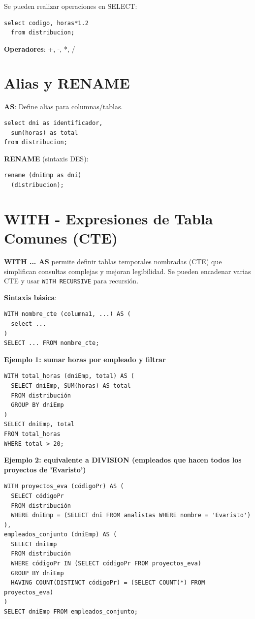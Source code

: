 \documentclass[8pt,a4paper,twocolumn]{article}
\begin{document}
Se pueden realizar operaciones en SELECT:
\begin{lstlisting}
select codigo, horas*1.2 
  from distribucion;
\end{lstlisting}

\textbf{Operadores}: +, -, *, /

\section{Alias y RENAME}

\textbf{AS}: Define alias para columnas/tablas.
\begin{lstlisting}
select dni as identificador,
  sum(horas) as total
from distribucion;
\end{lstlisting}

\textbf{RENAME} (sintaxis DES):
\begin{lstlisting}
rename (dniEmp as dni)
  (distribucion);
\end{lstlisting}

\section{WITH - Expresiones de Tabla Comunes (CTE)}

\textbf{WITH ... AS} permite definir tablas temporales nombradas (CTE) que simplifican consultas complejas y mejoran legibilidad. Se pueden encadenar varias CTE y usar \texttt{WITH RECURSIVE} para recursión.

\textbf{Sintaxis básica}:
\begin{lstlisting}
WITH nombre_cte (columna1, ...) AS (
  select ...
)
SELECT ... FROM nombre_cte;
\end{lstlisting}

\textbf{Ejemplo 1: sumar horas por empleado y filtrar}
\begin{lstlisting}
WITH total_horas (dniEmp, total) AS (
  SELECT dniEmp, SUM(horas) AS total
  FROM distribución
  GROUP BY dniEmp
)
SELECT dniEmp, total
FROM total_horas
WHERE total > 20;
\end{lstlisting}

\textbf{Ejemplo 2: equivalente a DIVISION (empleados que hacen todos los proyectos de 'Evaristo')}
\begin{lstlisting}
WITH proyectos_eva (códigoPr) AS (
  SELECT códigoPr
  FROM distribución
  WHERE dniEmp = (SELECT dni FROM analistas WHERE nombre = 'Evaristo')
),
empleados_conjunto (dniEmp) AS (
  SELECT dniEmp
  FROM distribución
  WHERE códigoPr IN (SELECT códigoPr FROM proyectos_eva)
  GROUP BY dniEmp
  HAVING COUNT(DISTINCT códigoPr) = (SELECT COUNT(*) FROM proyectos_eva)
)
SELECT dniEmp FROM empleados_conjunto;
\end{lstlisting}
\end{document}
